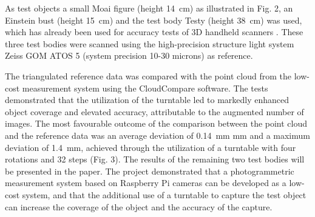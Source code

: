 \documentclass{isprs} %
\begin{document}
As test objects a small Moai figure (height \SI{14}{\centi\metre}) as illustrated in Fig. 2, an Einstein bust (height \SI{15}{\centi\metre}) and the
test body Testy (height \SI{38}{\centi\metre}) was used, which has already been used for accuracy tests of 3D handheld
scanners \cite{kersten_scanner}. These three test bodies were scanned using the high-precision structure light
system Zeiss GOM ATOS 5 (system precision 10-30 microns) as reference.

The triangulated reference data was compared with the point cloud from the low-cost measurement system using
the CloudCompare software. The tests demonstrated that the utilization of the turntable led to markedly
enhanced object coverage and elevated accuracy, attributable to the augmented number of images. The most
favourable outcome of the comparison between the point cloud and the reference data was an average deviation
of \SI{0.14}{\milli\metre} mm and a maximum deviation of \SI{1.4}{\milli\metre}, achieved through the utilization of a turntable with four
rotations and 32 steps (Fig. 3). The results of the remaining two test bodies will be presented in the paper. The
project demonstrated that a photogrammetric measurement system based on Raspberry Pi cameras can be
developed as a low-cost system, and that the additional use of a turntable to capture the test object can increase
the coverage of the object and the accuracy of the capture.

	{
		\begin{spacing}{1.17}
			\normalsize
		\end{spacing}
	}
\end{document}
